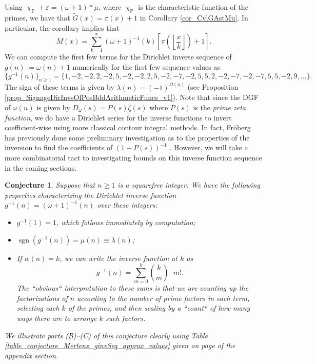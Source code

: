 \documentclass[11pt,reqno,a4letter]{article}
\numberwithin{figure}{section}
\numberwithin{table}{section}
\renewcommand{\chi}{\upchi}
\newcommand{\Floor}[2]{\ensuremath{\left\lfloor \frac{#1}{#2} \right\rfloor}}
\theoremstyle{plain}
\newtheorem{conjecture}[theorem]{Conjecture}
\numberwithin{theorem}{section}
\theoremstyle{definition}
\begin{document}
Using $\chi_{\mathbb{P}} + \varepsilon = (\omega + 1) \ast \mu$, 
where $\chi_{\mathbb{P}}$ is the characteristic 
function of the primes, we have that $\widetilde{G}(x) = \pi(x) + 1$ in 
Corollary \ref{cor_CvlGAstMu}. 
In particular, the corollary implies that 
\begin{equation} 
\label{eqn_Mx_gInvnPixk_formula} 
M(x) = \sum_{k=1}^{x} (\omega+1)^{-1}(k) \left[\pi\left(\Floor{x}{k}\right) + 1\right]. 
\end{equation} 
We can compute the first few terms for the
Dirichlet inverse sequence of 
$g(n) := \omega(n) + 1$ numerically for the first few sequence values as 
\[
\{g^{-1}(n)\}_{n \geq 1} = \{1, -2, -2, 2, -2, 5, -2, -2, 2, 5, -2, -7, -2, 5, 5, 2, -2, -7, -2, 
     -7, 5, 5, -2, 9, \ldots \}. 
\] 
The sign of these terms is given by $\lambda(n) = (-1)^{\Omega(n)}$ 
(see Proposition \ref{prop_SignageDirInvsOfPosBddArithmeticFuncs_v1}). 
Note that since the DGF of $\omega(n)$ is given by 
$D_{\omega}(s) = P(s) \zeta(s)$ where $P(s)$ is the \emph{prime zeta function}, we do have a 
Dirichlet series for the inverse functions to invert coefficient-wise using more classical 
contour integral methods. 
In fact, Fr\"oberg has previously done some preliminary investigation as to the properties of the 
inversion to find the coefficients of $(1+P(s))^{-1}$ \cite{FROBERG-1968}. 
However, we will take a more combinatorial tact to investigating bounds on this inverse function 
sequence in the coming sections. 

\begin{conjecture}
\label{lemma_gInv_MxExample} 
Suppose that $n \geq 1$ is a squarefree integer. We have the following properties characterizing the 
Dirichlet inverse function $g^{-1}(n) = (\omega+1)^{-1}(n)$ over these integers: 
\begin{itemize} 

\item[(A)] $g^{-1}(1) = 1$, which follows immediately by computation; 
\item[(B)] $\operatorname{sgn}(g^{-1}(n)) = \mu(n) \equiv \lambda(n)$; 
\item[(C)] If $w(n) = k$, we can write the inverse function at $k$ as 
     \[
     g^{-1}(n) = \sum_{m=0}^{k} \binom{k}{m} \cdot m!. 
     \]
     The ``obvious`` interpretation to these sums is that we are counting up the factorizations of 
     $n$ according to the number of prime factors in each term, selecting each $k$ of the primes, and then 
     scaling by a ``count`` of how many ways there are to arrange $k$ such factors.
\end{itemize} 
We illustrate parts (B)--(C) of this conjecture clearly using 
Table \ref{table_conjecture_Mertens_ginvSeq_approx_values} given on 
page \pageref{table_conjecture_Mertens_ginvSeq_approx_values} of the appendix section. 
\end{conjecture} 
\end{document}
